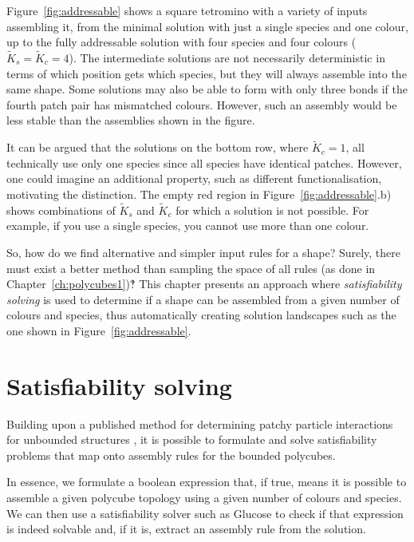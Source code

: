 Figure~\ref{fig:addressable} shows a square tetromino with a variety of inputs assembling it, from the minimal solution with just a single species and one colour, up to the fully addressable solution with four species and four colours (\(\widetilde{K}_s = \widetilde{K}_c = 4\)). The intermediate solutions are not necessarily deterministic in terms of which position gets which species, but they will always assemble into the same shape. Some solutions may also be able to form with only three bonds if the fourth patch pair has mismatched colours. However, such an assembly would be less stable than the assemblies shown in the figure. 

It can be argued that the solutions on the bottom row, where \(\widetilde{K}_c=1\), all technically use only one species since all species have identical patches. However, one could imagine an additional property, such as different functionalisation, motivating the distinction. The empty red region in Figure~\ref{fig:addressable}.b) shows combinations of \(\widetilde{K}_s\) and \(\widetilde{K}_c\) for which a solution is not possible. For example, if you use a single species, you cannot use more than one colour.



So, how do we find alternative and simpler input rules for a shape? Surely, there must exist a better method than sampling the space of all rules (as done in Chapter~\ref{ch:polycubes1})‽ This chapter presents an approach where \emph{satisfiability solving} is used to determine if a shape can be assembled from a given number of colours and species, thus automatically creating solution landscapes such as the one shown in Figure~\ref{fig:addressable}.


\section{Satisfiability solving}
\label{sec:SAT}

Building upon a published method for determining patchy particle interactions for unbounded structures \cite{romano2020designing}, it is possible to formulate and solve satisfiability problems that map onto assembly rules for the bounded polycubes.

In essence, we formulate a boolean expression that, if true, means it is possible to assemble a given polycube topology using a given number of colours and species. We can then use a satisfiability solver such as Glucose \cite{audemard2009glucose, imms-sat18} to check if that expression is indeed solvable and, if it is, extract an assembly rule from the solution.

